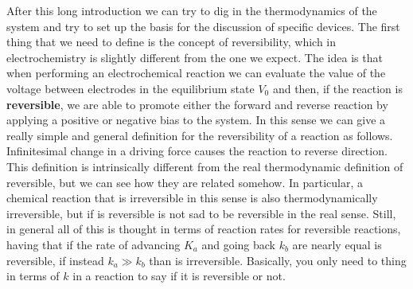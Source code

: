 After this long introduction we can try to dig in the thermodynamics of the system and try to set up the basis for the discussion of specific devices. The first thing that we need to define is the concept of reversibility, which in electrochemistry is slightly different from the one we expect. The idea is that when performing an electrochemical reaction we can evaluate the value of the voltage between electrodes in the equilibrium state $V_0$ and then, if the reaction is \textbf{reversible}, we are able to promote either the forward and reverse reaction by applying a positive or negative bias to the system. In this sense we can give a really simple and general definition for the reversibility of a reaction as follows.
{
    Infinitesimal change in a driving force causes the reaction to reverse direction.
}
\noindent
This definition is intrinsically different from the real thermodynamic definition of reversible, but we can see how they are related somehow. In particular, a chemical reaction that is irreversible in this sense is also thermodynamically irreversible, but if is reversible is not sad to be reversible in the real sense. Still, in general all of this is thought in terms of reaction rates for reversible reactions, having that if the rate of advancing $K_a$ and going back $k_b$ are nearly equal is reversible, if instead $k_a \gg k_b$ than is irreversible. Basically, you only need to thing in terms of $k$ in a reaction to say if it is reversible or not.

